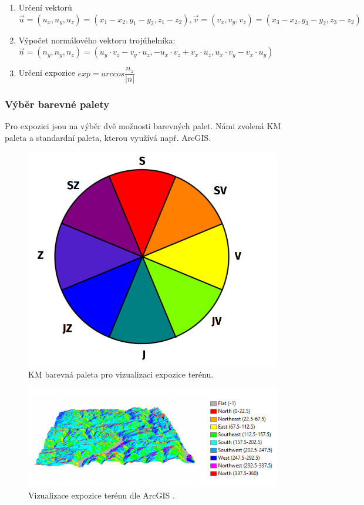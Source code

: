 \documentclass[a4paper, 12pt, oneside, titlepage]{article} %
\begin{document}
\begin{enumerate}
\item Určení vektorů $\overrightarrow{u}=(u_x,u_y,u_z)=(x_1-x_2, y_1-y_2, z_1-z_2), \overrightarrow{v}=(v_x,v_y,v_z)=(x_3-x_2,y_3-y_2,z_3-z_2)$ 
\item Výpočet normálového vektoru trojúhelníka: $\overrightarrow{n}=(n_y,n_y,n_z)=(u_y \cdot v_z-v_y \cdot u_z,-u_x \cdot v_z+v_x \cdot u_z,u_x \cdot v_y-v_x \cdot u_y)$
\item Určení expozice $exp=arccos\dfrac{n_z}{\vert n\vert}$
\end{enumerate}

\subsubsection{Výběr barevné palety}
Pro expozici jsou na výběr dvě možnosti barevných palet. Námi zvolená KM paleta a standardní paleta, kterou využívá např. ArcGIS.

\begin{figure}[!htb]
	\centering
	\includegraphics[scale=0.3]{obrazky/expozice_barvy.png} 
	\caption{KM barevná paleta pro vizualizaci expozice terénu.
	}
	\label{fig:expozice_barvy}
\end{figure} 
\FloatBarrier

\begin{figure}[!htb]
	\centering
	\includegraphics[scale=0.7]{obrazky/esri_expozice.png} 
	\caption{Vizualizace expozice terénu dle ArcGIS \cite{arcgispro}.
	}
	\label{fig:esri_expozice}
\end{figure} 
\FloatBarrier
\end{document}
